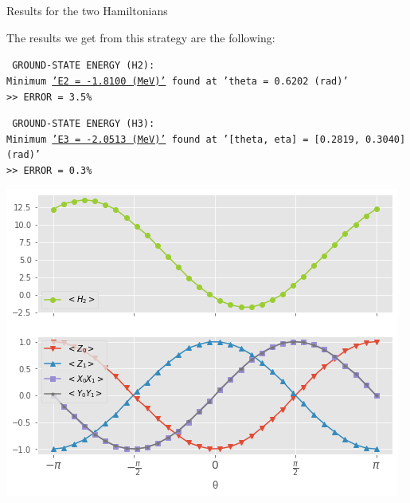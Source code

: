 \documentclass[9pt, handout, aspectratio=169]{beamer}		%
\begin{document}
	\begin{frame}{Results for the two Hamiltonians}

		The results we get from this strategy are the following:

		\bigskip

		\texttt{ \small
			GROUND-STATE ENERGY (H2): \\
			Minimum \underline{'E2 = -1.8100 (MeV)'} found at 'theta = 0.6202 (rad)' \\
			>> ERROR = 3.5\% }

		\medskip

		\texttt{ \small
			GROUND-STATE ENERGY (H3): \\
			Minimum \underline{'E3 = -2.0513 (MeV)'} found at '[theta, eta] = [0.2819, 0.3040] (rad)' \\
			>> ERROR = 0.3\% }


		\begin{multicols}{2}

			\begin{center}
				\includegraphics[height=.40\paperheight]{Figures/h2_result}
			\end{center}

			\columnbreak


\end{multicols}
\end{frame}
\end{document}
